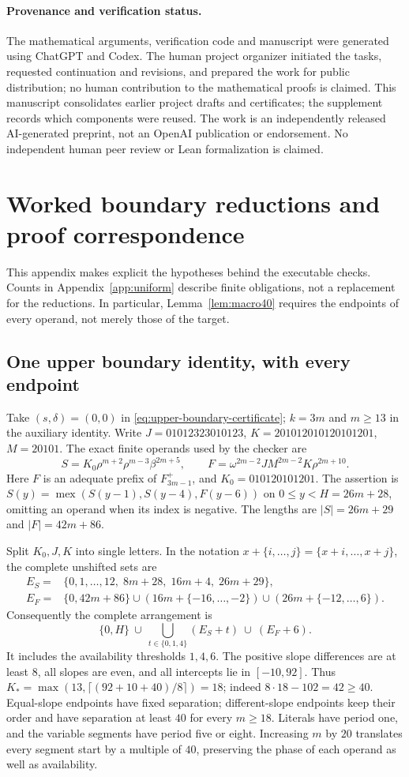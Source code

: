 \documentclass[11pt]{article}
\theoremstyle{remark}\newtheorem{remark}[theorem]{Remark}
\DeclareMathOperator{\mex}{mex}
\begin{document}
\paragraph{Provenance and verification status.}
The mathematical arguments, verification code and manuscript were generated
using ChatGPT and Codex. The human project organizer initiated the tasks,
requested continuation and revisions, and prepared the work for public
distribution; no human contribution to the mathematical proofs is claimed.
This manuscript consolidates earlier project drafts and certificates;
the supplement records which components were reused. The work is an
independently released AI-generated preprint, not an OpenAI publication
or endorsement. No independent human peer review or Lean formalization
is claimed.


\section{Worked boundary reductions and proof correspondence}\label{app:proof-map}
This appendix makes explicit the hypotheses behind the executable checks.
Counts in Appendix~\ref{app:uniform} describe finite obligations, not a
replacement for the reductions. In particular, Lemma~\ref{lem:macro40}
requires the endpoints of every operand, not merely those of the target.

\subsection{One upper boundary identity, with every endpoint}
Take $(s,\delta)=(0,0)$ in \eqref{eq:upper-boundary-certificate};
$k=3m$ and $m\ge13$ in the auxiliary identity. Write
$J=01012323010123$, $K=201012010120101201$, $M=20101$.
The exact finite operands used by the checker are
\[
S=K_0\rho^{m+2}\rho^{m-3}\beta^{2m+5},\qquad
F=\omega^{2m-2}J M^{2m-2}K\rho^{2m+10}.
\]
Here $F$ is an adequate prefix of $F^+_{3m-1}$, and $K_0=010120101201$.
The assertion is $S(y)=\mex(S(y-1),S(y-4),F(y-6))$ on
$0\le y<H=26m+28$, omitting an operand when its index is negative.
The lengths are $|S|=26m+29$ and $|F|=42m+86$.

Split $K_0,J,K$ into single letters. In the notation
$x+\{i,\ldots,j\}=\{x+i,\ldots,x+j\}$, the complete unshifted sets are
\begin{align*}
E_S={}&\{0,1,\ldots,12,\;8m+28,\;16m+4,\;26m+29\},\\
E_F={}&\{0,42m+86\}\cup(16m+\{-16,\ldots,-2\})
                     \cup(26m+\{-12,\ldots,6\}).
\end{align*}
Consequently the complete arrangement is
\[
\{0,H\}\ \cup\ \bigcup_{t\in\{0,1,4\}}(E_S+t)\ \cup\ (E_F+6).
\]
It includes the availability thresholds $1,4,6$. The positive slope
differences are at least $8$, all slopes are even, and all intercepts
lie in $[-10,92]$. Thus
$K_*=\max(13,\lceil(92+10+40)/8\rceil)=18$;
indeed $8\cdot18-102=42\ge40$. Equal-slope endpoints have fixed
separation; different-slope endpoints keep their order and have separation
at least $40$ for every $m\ge18$. Literals have period one, and the
variable segments have period five or eight. Increasing $m$ by $20$
translates every segment start by a multiple of $40$, preserving the
phase of each operand as well as availability.
\end{document}
